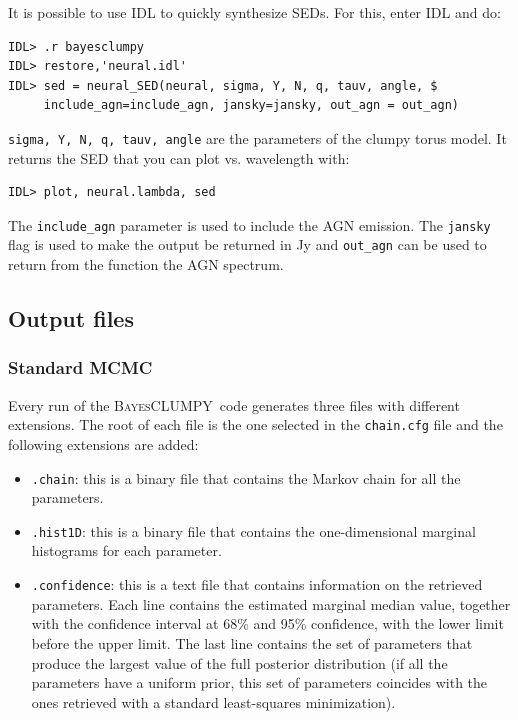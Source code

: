 \documentclass[12pt]{article}
\def\B{\textsc{BayesCLUMPY}}
\begin{document}
It is possible to use IDL to quickly synthesize SEDs. For this, enter IDL and do:
\begin{verbatim}
IDL> .r bayesclumpy
IDL> restore,'neural.idl'
IDL> sed = neural_SED(neural, sigma, Y, N, q, tauv, angle, $
     include_agn=include_agn, jansky=jansky, out_agn = out_agn)
\end{verbatim}
\texttt{sigma, Y, N, q, tauv, angle} are the parameters of the clumpy torus model. It returns
the SED that you can plot vs. wavelength with:
\begin{verbatim}
IDL> plot, neural.lambda, sed
\end{verbatim}
The \texttt{include\_agn} parameter is used to include the AGN emission. The \texttt{jansky} flag is 
used to make the output be returned in Jy and \texttt{out\_agn} can be used to return from
the function the AGN spectrum.

\subsection{Output files}
\label{sec:output}

\subsubsection{Standard MCMC}
Every run of the \B\ code generates three files with different extensions. The root
of each file is the one selected in the \texttt{chain.cfg} file and the following
extensions are added:
\begin{itemize}
 \item \texttt{.chain}: this is a binary file that contains the Markov chain for all the parameters.
 \item \texttt{.hist1D}: this is a binary file that contains the one-dimensional marginal histograms
   for each parameter.
 \item \texttt{.confidence}: this is a text file that contains information on the retrieved parameters.
 Each line contains the estimated marginal median value, together with the confidence interval at 68\%
 and 95\% confidence, with the lower limit before the upper limit. The last line contains the set of
 parameters that produce the largest value of the full posterior distribution (if all the parameters
 have a uniform prior, this set of parameters coincides with the ones retrieved with a standard 
 least-squares minimization).
\end{itemize}
\end{document}
